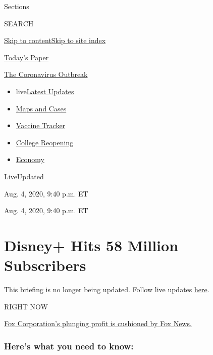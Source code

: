 Sections

SEARCH

\protect\hyperlink{site-content}{Skip to
content}\protect\hyperlink{site-index}{Skip to site index}

\href{https://myaccount.nytimes3xbfgragh.onion/auth/login?response_type=cookie\&client_id=vi}{}

\href{https://www.nytimes3xbfgragh.onion/section/todayspaper}{Today's
Paper}

\href{https://www.nytimes3xbfgragh.onion/news-event/coronavirus}{The
Coronavirus Outbreak}

\begin{itemize}
\tightlist
\item
  live\href{https://www.nytimes3xbfgragh.onion/2020/08/04/world/coronavirus-cases.html}{Latest
  Updates}
\item
  \href{https://www.nytimes3xbfgragh.onion/interactive/2020/us/coronavirus-us-cases.html}{Maps
  and Cases}
\item
  \href{https://www.nytimes3xbfgragh.onion/interactive/2020/science/coronavirus-vaccine-tracker.html}{Vaccine
  Tracker}
\item
  \href{https://www.nytimes3xbfgragh.onion/2020/08/02/us/covid-college-reopening.html}{College
  Reopening}
\item
  \href{https://www.nytimes3xbfgragh.onion/live/2020/08/04/business/stock-market-today-coronavirus}{Economy}
\end{itemize}

LiveUpdated~

Aug. 4, 2020, 9:40 p.m. ET

Aug. 4, 2020, 9:40 p.m. ET

\hypertarget{disney-hits-58-million-subscribers}{%
\section{Disney+ Hits 58 Million
Subscribers}\label{disney-hits-58-million-subscribers}}

This briefing is no longer being updated. Follow live updates
\href{https://www.nytimes3xbfgragh.onion/2020/08/04/world/coronavirus-cases.html}{here}.

RIGHT NOW

\protect\hyperlink{fox-corporations-plunging-profit-is-cushioned-by-fox-news}{Fox
Corporation's plunging profit is cushioned by Fox News.}

\hypertarget{heres-what-you-need-to-know}{%
\subsubsection{Here's what you need to
know:}\label{heres-what-you-need-to-know}}

